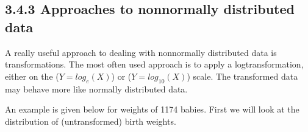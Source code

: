 \documentclass[letterpaper,10pt,english]{jupyterBook}
\begin{document}
\subsection{3.4.3 Approaches to non\sphinxhyphen{}normally distributed data}
\label{\detokenize{03.e. Continuous Probability Distributions:approaches-to-non-normally-distributed-data}}
\sphinxAtStartPar
A really useful approach to dealing with non\sphinxhyphen{}normally distributed data is transformations. The most often used approach is to apply a log\sphinxhyphen{}transformation, either on the  (\(Y = log_e(X)\)) or  (\(Y = log_{10}(X)\)) scale. The transformed data may behave more like normally distributed data.

\sphinxAtStartPar
An example is given below for weights of 1174 babies. First we will look at the distribution of (untransformed) birth weights.
\end{document}
